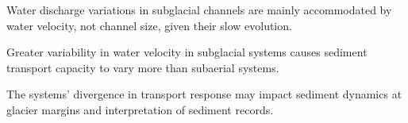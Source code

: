 \documentclass[draft]{agujournal2019}
\begin{document}





\begin{keypoints}
\item Water discharge variations in subglacial channels are mainly accommodated by water velocity, not channel size, given their slow evolution.

\item Greater variability in water velocity in subglacial systems causes sediment transport capacity to vary more than subaerial systems.

\item The systems' divergence in transport response may impact sediment dynamics at glacier margins and interpretation of sediment records.
\end{keypoints}


% 
% 

% 
% 
\end{document}
